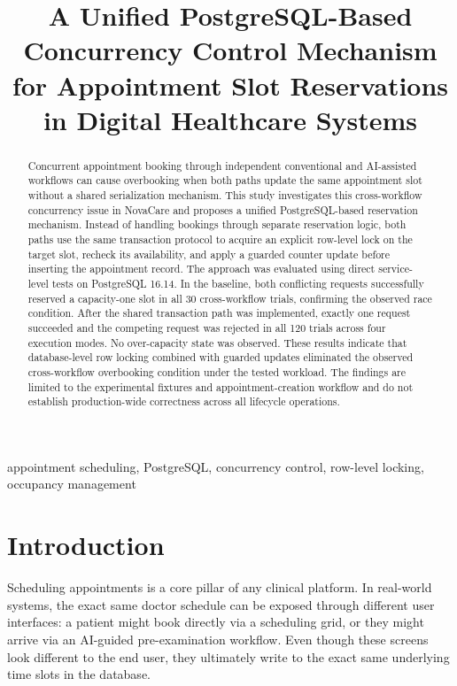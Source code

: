 \documentclass[conference]{IEEEtran}
\title{A Unified PostgreSQL-Based Concurrency Control Mechanism for Appointment Slot Reservations in Digital Healthcare Systems}
\author{%
\IEEEauthorblockN{Trinh Van Vu, Nguyen Chi Thuan, and Huynh Nam}
\IEEEauthorblockA{\textit{Faculty of Information Technology, Industrial University of Ho Chi Minh City}\\
}
}
\begin{document}
\maketitle
\pagestyle{ieeeheader}
\thispagestyle{ieeeheader}

\begin{abstract}
Concurrent appointment booking through independent conventional and AI-assisted workflows can cause overbooking when both paths update the same appointment slot without a shared serialization mechanism. This study investigates this cross-workflow concurrency issue in NovaCare and proposes a unified PostgreSQL-based reservation mechanism. Instead of handling bookings through separate reservation logic, both paths use the same transaction protocol to acquire an explicit row-level lock on the target slot, recheck its availability, and apply a guarded counter update before inserting the appointment record. The approach was evaluated using direct service-level tests on PostgreSQL 16.14. In the baseline, both conflicting requests successfully reserved a capacity-one slot in all 30 cross-workflow trials, confirming the observed race condition. After the shared transaction path was implemented, exactly one request succeeded and the competing request was rejected in all 120 trials across four execution modes. No over-capacity state was observed. These results indicate that database-level row locking combined with guarded updates eliminated the observed cross-workflow overbooking condition under the tested workload. The findings are limited to the experimental fixtures and appointment-creation workflow and do not establish production-wide correctness across all lifecycle operations.
\end{abstract}
\vspace{0.5\baselineskip}
\begin{IEEEkeywords}
appointment scheduling, PostgreSQL, concurrency control, row-level locking, occupancy management
\end{IEEEkeywords}

\section{Introduction}
Scheduling appointments is a core pillar of any clinical platform. In real-world systems, the exact same doctor schedule can be exposed through different user interfaces: a patient might book directly via a scheduling grid, or they might arrive via an AI-guided pre-examination workflow. Even though these screens look different to the end user, they ultimately write to the exact same underlying time slots in the database.
\end{document}
